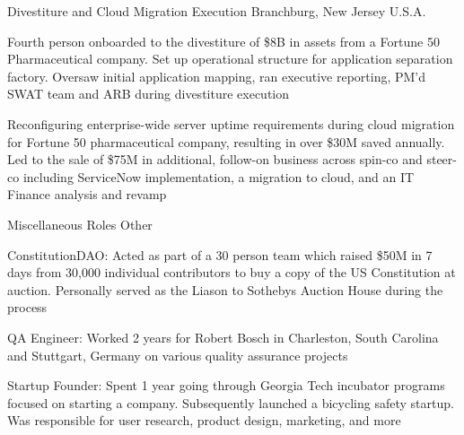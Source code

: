 \begin{cventries}
  \cventry
    {Divestiture and Cloud Migration Execution} %
    {} %
    {} %
    {Branchburg, New Jersey U.S.A.} %
    {
      \begin{cvitems} %
        \item {Fourth person onboarded to the divestiture of \$8B in assets from a Fortune 50 Pharmaceutical company. Set up operational structure for application separation factory. Oversaw initial application mapping, ran executive reporting, PM’d SWAT team and ARB during divestiture execution}
        \item {Reconfiguring enterprise-wide server uptime requirements during cloud migration for Fortune 50 pharmaceutical company, resulting in over \$30M saved annually. Led to the sale of \$75M in additional, follow-on business across spin-co and steer-co including ServiceNow implementation, a migration to cloud, and an IT Finance analysis and revamp}
      \end{cvitems}
    }

  \cventry
    {Miscellaneous Roles} %
    {Other} %
    {} %
    {} %
    {
      \begin{cvitems} %
        \item {ConstitutionDAO: Acted as part of a 30 person team which raised \$50M in 7 days from 30,000 individual contributors to buy a copy of the US Constitution at auction. Personally served as the Liason to Sothebys Auction House during the process}
        \item {QA Engineer: Worked 2 years for Robert Bosch in Charleston, South Carolina and Stuttgart, Germany on various quality assurance projects}
        \item {Startup Founder: Spent 1 year going through Georgia Tech incubator programs focused on starting a company. Subsequently launched a bicycling safety startup. Was responsible for user research, product design, marketing, and more}
      \end{cvitems}
    }

\end{cventries}
